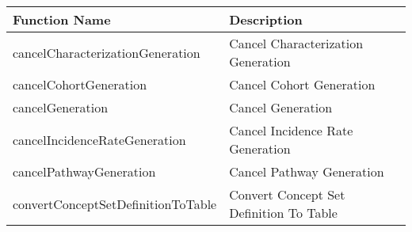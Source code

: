 \documentclass[
]{article}
\begin{document}
\begin{longtable}[]{@{}ll@{}}
\toprule
\begin{minipage}[b]{0.46\columnwidth}\raggedright
Function Name\strut
\end{minipage} & \begin{minipage}[b]{0.48\columnwidth}\raggedright
Description\strut
\end{minipage}\tabularnewline
\midrule
\endhead
\begin{minipage}[t]{0.46\columnwidth}\raggedright
cancelCharacterizationGeneration\strut
\end{minipage} & \begin{minipage}[t]{0.48\columnwidth}\raggedright
Cancel Characterization Generation\strut
\end{minipage}\tabularnewline
\begin{minipage}[t]{0.46\columnwidth}\raggedright
cancelCohortGeneration\strut
\end{minipage} & \begin{minipage}[t]{0.48\columnwidth}\raggedright
Cancel Cohort Generation\strut
\end{minipage}\tabularnewline
\begin{minipage}[t]{0.46\columnwidth}\raggedright
cancelGeneration\strut
\end{minipage} & \begin{minipage}[t]{0.48\columnwidth}\raggedright
Cancel Generation\strut
\end{minipage}\tabularnewline
\begin{minipage}[t]{0.46\columnwidth}\raggedright
cancelIncidenceRateGeneration\strut
\end{minipage} & \begin{minipage}[t]{0.48\columnwidth}\raggedright
Cancel Incidence Rate Generation\strut
\end{minipage}\tabularnewline
\begin{minipage}[t]{0.46\columnwidth}\raggedright
cancelPathwayGeneration\strut
\end{minipage} & \begin{minipage}[t]{0.48\columnwidth}\raggedright
Cancel Pathway Generation\strut
\end{minipage}\tabularnewline
\begin{minipage}[t]{0.46\columnwidth}\raggedright
convertConceptSetDefinitionToTable\strut
\end{minipage} & \begin{minipage}[t]{0.48\columnwidth}\raggedright
Convert Concept Set Definition To Table\strut

\end{minipage}
\end{longtable}
\end{document}
